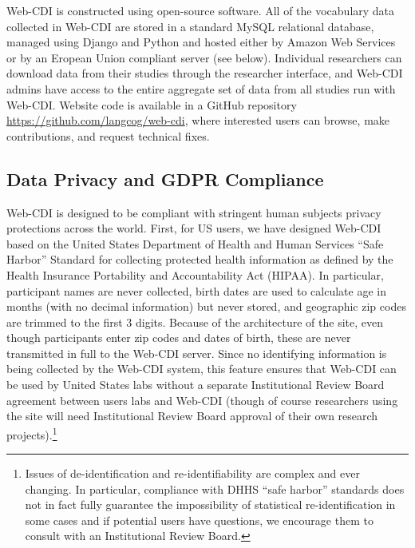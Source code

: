 \documentclass[
  english,
  ,man,floatsintext]{apa6}
\begin{document}
Web-CDI is constructed using open-source software. All of the vocabulary data collected in Web-CDI are stored in a standard MySQL relational database, managed using Django and Python and hosted either by Amazon Web Services or by an Eropean Union compliant server (see below). Individual researchers can download data from their studies through the researcher interface, and Web-CDI admins have access to the entire aggregate set of data from all studies run with Web-CDI. Website code is available in a GitHub repository \url{https://github.com/langcog/web-cdi}, where interested users can browse, make contributions, and request technical fixes.

\hypertarget{data-privacy-and-gdpr-compliance}{%
\subsection{Data Privacy and GDPR Compliance}\label{data-privacy-and-gdpr-compliance}}

Web-CDI is designed to be compliant with stringent human subjects privacy protections across the world. First, for US users, we have designed Web-CDI based on the United States Department of Health and Human Services \enquote{Safe Harbor} Standard for collecting protected health information as defined by the Health Insurance Portability and Accountability Act (HIPAA). In particular, participant names are never collected, birth dates are used to calculate age in months (with no decimal information) but never stored, and geographic zip codes are trimmed to the first 3 digits. Because of the architecture of the site, even though participants enter zip codes and dates of birth, these are never transmitted in full to the Web-CDI server. Since no identifying information is being collected by the Web-CDI system, this feature ensures that Web-CDI can be used by United States labs without a separate Institutional Review Board agreement between users labs and Web-CDI (though of course researchers using the site will need Institutional Review Board approval of their own research projects).\footnote{Issues of de-identification and re-identifiability are complex and ever changing. In particular, compliance with DHHS \enquote{safe harbor} standards does not in fact fully guarantee the impossibility of statistical re-identification in some cases and if potential users have questions, we encourage them to consult with an Institutional Review Board.}
\end{document}

